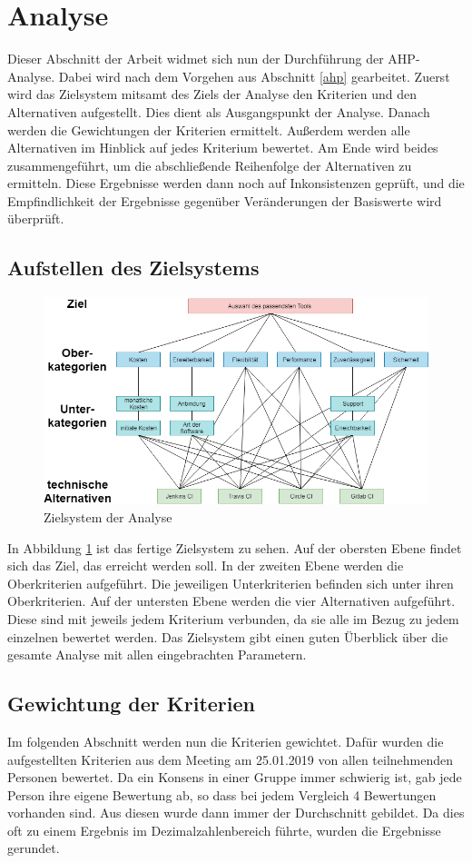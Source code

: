 \section{Analyse}
Dieser Abschnitt der Arbeit widmet sich nun der Durchführung der AHP-Analyse. Dabei wird nach dem Vorgehen aus Abschnitt \ref{ahp} gearbeitet. Zuerst wird das Zielsystem mitsamt des Ziels der Analyse den Kriterien und den Alternativen aufgestellt. Dies dient als Ausgangspunkt der Analyse. Danach werden die Gewichtungen der Kriterien ermittelt. Außerdem werden alle Alternativen im Hinblick auf jedes Kriterium bewertet. Am Ende wird beides zusammengeführt, um die abschließende Reihenfolge der Alternativen zu ermitteln. Diese Ergebnisse werden dann noch auf Inkonsistenzen geprüft, und die Empfindlichkeit der Ergebnisse gegenüber Veränderungen der Basiswerte wird überprüft.
\subsection{Aufstellen des Zielsystems}
\begin{figure}[h!]
	\centering
	\includegraphics[angle=90, scale = 0.7]{img/ZIEL.png}
	\caption{Zielsystem der Analyse}
	\label{img:ziel}
\end{figure}
In Abbildung \ref{img:ziel} ist das fertige Zielsystem zu sehen. Auf der obersten Ebene findet sich das Ziel, das erreicht werden soll. In der zweiten Ebene werden die Oberkriterien aufgeführt. Die jeweiligen Unterkriterien befinden sich unter ihren Oberkriterien. Auf der untersten Ebene werden die vier Alternativen aufgeführt. Diese sind mit jeweils jedem Kriterium verbunden, da sie alle im Bezug zu jedem einzelnen bewertet werden. Das Zielsystem gibt einen guten Überblick über die gesamte Analyse mit allen eingebrachten Parametern.
\subsection{Gewichtung der Kriterien}
Im folgenden Abschnitt werden nun die Kriterien gewichtet. Dafür wurden die aufgestellten Kriterien aus dem Meeting am 25.01.2019 von allen teilnehmenden Personen bewertet. Da ein Konsens in einer Gruppe immer schwierig ist, gab jede Person ihre eigene Bewertung ab, so dass bei jedem Vergleich 4 Bewertungen vorhanden sind. Aus diesen wurde dann immer der Durchschnitt gebildet. Da dies oft zu einem Ergebnis im Dezimalzahlenbereich führte, wurden die Ergebnisse gerundet. 
